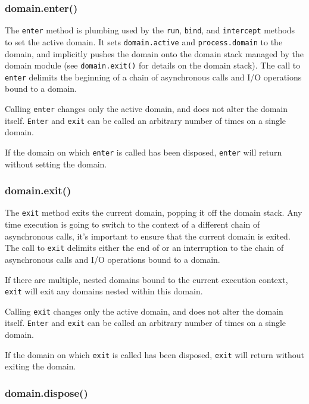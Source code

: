 \subsubsection{domain.enter()}\label{domain.enter}

The \texttt{enter} method is plumbing used by the \texttt{run},
\texttt{bind}, and \texttt{intercept} methods to set the active domain.
It sets \texttt{domain.active} and \texttt{process.domain} to the
domain, and implicitly pushes the domain onto the domain stack managed
by the domain module (see \texttt{domain.exit()} for details on the
domain stack). The call to \texttt{enter} delimits the beginning of a
chain of asynchronous calls and I/O operations bound to a domain.

Calling \texttt{enter} changes only the active domain, and does not
alter the domain itself. \texttt{Enter} and \texttt{exit} can be called
an arbitrary number of times on a single domain.

If the domain on which \texttt{enter} is called has been disposed,
\texttt{enter} will return without setting the domain.

\subsubsection{domain.exit()}\label{domain.exit}

The \texttt{exit} method exits the current domain, popping it off the
domain stack. Any time execution is going to switch to the context of a
different chain of asynchronous calls, it's important to ensure that the
current domain is exited. The call to \texttt{exit} delimits either the
end of or an interruption to the chain of asynchronous calls and I/O
operations bound to a domain.

If there are multiple, nested domains bound to the current execution
context, \texttt{exit} will exit any domains nested within this domain.

Calling \texttt{exit} changes only the active domain, and does not alter
the domain itself. \texttt{Enter} and \texttt{exit} can be called an
arbitrary number of times on a single domain.

If the domain on which \texttt{exit} is called has been disposed,
\texttt{exit} will return without exiting the domain.

\subsubsection{domain.dispose()}\label{domain.dispose}

